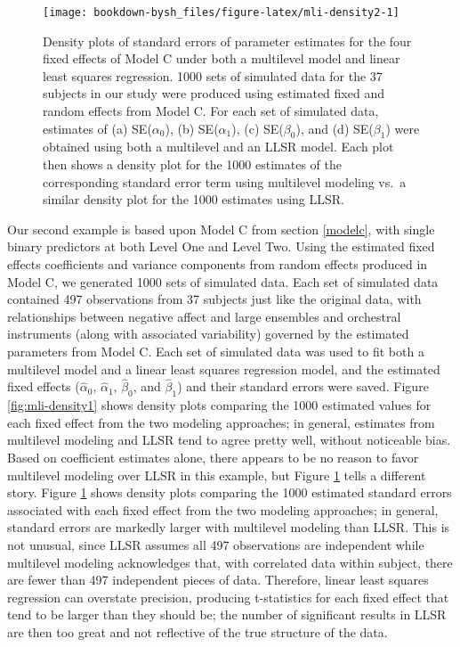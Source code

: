 \documentclass[
]{krantz}
\begin{document}
\begin{figure}

{\centering \texttt{[image: bookdown-bysh\_files/figure-latex/mli-density2-1]} 

}

\caption{Density plots of standard errors of parameter estimates for the four fixed effects of Model C under both a multilevel model and linear least squares regression. 1000 sets of simulated data for the 37 subjects in our study were produced using estimated fixed and random effects from Model C. For each set of simulated data, estimates of (a) SE(\(\alpha_{0}\)), (b) SE(\(\alpha_{1}\)), (c) SE(\(\beta_{0}\)), and (d) SE(\(\beta_{1}\)) were obtained using both a multilevel and an LLSR model. Each plot then shows a density plot for the 1000 estimates of the corresponding standard error term using multilevel modeling vs.~a similar density plot for the 1000 estimates using LLSR.}\label{fig:mli-density2}
\end{figure}

Our second example is based upon Model C from section \ref{modelc}, with single binary predictors at both Level One and Level Two. Using the estimated fixed effects coefficients and variance components from random effects produced in Model C, we generated 1000 sets of simulated data. Each set of simulated data contained 497 observations from 37 subjects just like the original data, with relationships between negative affect and large ensembles and orchestral instruments (along with associated variability) governed by the estimated parameters from Model C. Each set of simulated data was used to fit both a multilevel model and a linear least squares regression model, and the estimated fixed effects (\(\hat{\alpha}_{0}\), \(\hat{\alpha}_{1}\), \(\hat{\beta}_{0}\), and \(\hat{\beta}_{1}\)) and their standard errors were saved. Figure \ref{fig:mli-density1} shows density plots comparing the 1000 estimated values for each fixed effect from the two modeling approaches; in general, estimates from multilevel modeling and LLSR tend to agree pretty well, without noticeable bias. Based on coefficient estimates alone, there appears to be no reason to favor multilevel modeling over LLSR in this example, but Figure \ref{fig:mli-density2} tells a different story. Figure \ref{fig:mli-density2} shows density plots comparing the 1000 estimated standard errors associated with each fixed effect from the two modeling approaches; in general, standard errors are markedly larger with multilevel modeling than LLSR. This is not unusual, since LLSR assumes all 497 observations are independent while multilevel modeling acknowledges that, with correlated data within subject, there are fewer than 497 independent pieces of data. Therefore, linear least squares regression can overstate precision, producing t-statistics for each fixed effect that tend to be larger than they should be; the number of significant results in LLSR are then too great and not reflective of the true structure of the data.
\end{document}
